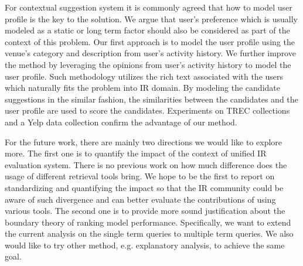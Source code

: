 For contextual suggestion system it is commonly agreed that how to model user 
profile is the key to the solution. We argue that user's preference which is 
usually modeled as a static or long term factor should also be considered as 
part of the context of this problem. 
Our first approach is to model the user profile using the venue's category 
and description from user's activity history. We further improve the 
method by leveraging the opinions from user's activity history to model the 
user profile. Such methodology utilizes the rich text associated 
with the users which naturally fits the problem into IR domain. 
By modeling the candidate suggestions in the similar fashion, 
the similarities between the candidates and the user profile are used to 
score the candidates. Experiments on TREC collections and a 
Yelp data collection confirm the advantage of our method.

For the future work, there are mainly two directions we would like to explore more. 
The first one is to quantify the impact of the context of unified 
IR evaluation system. There is no previous work on how much difference does 
the usage of different retrieval tools bring.
We hope to be the first to report on standardizing and quantifying the 
impact so that the IR community could be aware of such divergence and can 
better evaluate the contributions of using various tools. 
The second one is to provide more sound justification about the boundary 
theory of ranking model performance. Specifically, we want to extend the 
current analysis on the single term queries to multiple term queries. 
We also would like to try other method, e.g. explanatory analysis, 
to achieve the same goal.
